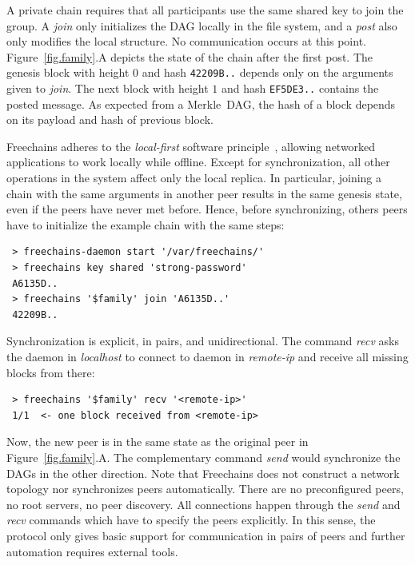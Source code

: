\documentclass[10pt,journal,compsoc]{IEEEtran}
\newcommand{\FC}       {Freechains\xspace}
\begin{document}
A private chain requires that all participants use the same shared key to join
the group.
A \emph{join} only initializes the DAG locally in the file system, and a
\emph{post} also only modifies the local structure.
No communication occurs at this point.
Figure~\ref{fig.family}.A depicts the state of the chain after the first post.
The genesis block with height $0$ and hash \texttt{42209B..}
depends only on the arguments given to \emph{join}.
The next block with height $1$ and hash \texttt{EF5DE3..} contains the posted
message.
As expected from a Merkle~DAG, the hash of a block depends on its payload and
hash of previous block.

\FC adheres to the \emph{local-first} software principle~\cite{p2p.local},
allowing networked applications to work locally while offline.
Except for synchronization, all other operations in the system affect only the
local replica.
In particular, joining a chain with the same arguments in another peer results
in the same genesis state, even if the peers have never met before.
Hence, before synchronizing, others peers have to initialize the example chain
with the same steps:

{\footnotesize
\begin{verbatim}
 > freechains-daemon start '/var/freechains/'
 > freechains key shared 'strong-password'
 A6135D..
 > freechains '$family' join 'A6135D..'
 42209B..
\end{verbatim}
}

Synchronization is explicit, in pairs, and unidirectional.
The command \emph{recv} asks the daemon in \emph{localhost} to connect to
daemon in \emph{remote-ip} and receive all missing blocks from there:

{\footnotesize
\begin{verbatim}
 > freechains '$family' recv '<remote-ip>'
 1/1  <- one block received from <remote-ip>
\end{verbatim}
}

Now, the new peer is in the same state as the original peer in
Figure~\ref{fig.family}.A.
The complementary command \emph{send} would synchronize the DAGs in the other
direction.
Note that \FC does not construct a network topology nor synchronizes peers
automatically.
There are no preconfigured peers, no root servers, no peer discovery.
All connections happen through the \emph{send} and \emph{recv} commands which
have to specify the peers explicitly.
In this sense, the protocol only gives basic support for communication in pairs
of peers and further automation requires external tools.
\end{document}
